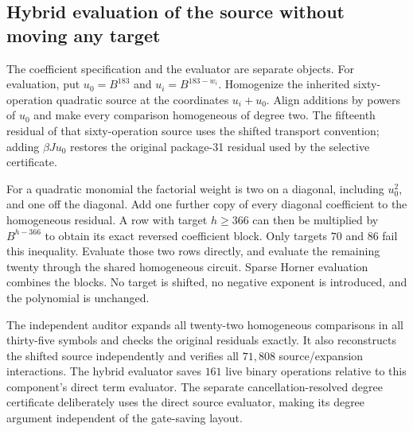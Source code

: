 \subsection{Hybrid evaluation of the source without moving any target}
The coefficient specification and the evaluator are separate objects.
For evaluation, put $u_0=B^{183}$ and $u_i=B^{183-w_i}$.
Homogenize the inherited sixty-operation quadratic source at the coordinates
$u_i+u_0$. Align additions by powers of $u_0$ and make every comparison
homogeneous of degree two. The fifteenth residual of that sixty-operation
source uses the shifted transport convention; adding $\beta J u_0$ restores
the original package-31 residual used by the selective certificate.

For a quadratic monomial the factorial weight is two on a diagonal, including
$u_0^2$, and one off the diagonal. Add one further copy of every diagonal
coefficient to the homogeneous residual. A row with target $h\ge366$ can then
be multiplied by $B^{h-366}$ to obtain its exact reversed coefficient block.
Only targets $70$ and $86$ fail this inequality. Evaluate those two rows
directly, and evaluate the remaining twenty through the shared homogeneous
circuit. Sparse Horner evaluation combines the blocks. No target is shifted,
no negative exponent is introduced, and the polynomial is unchanged.

The independent auditor expands all twenty-two homogeneous comparisons in
all thirty-five symbols and checks the original residuals exactly. It also
reconstructs the shifted source independently and verifies all $71{,}808$
source/expansion interactions. The hybrid evaluator saves $161$ live binary
operations relative to this component's direct term evaluator. The separate
cancellation-resolved degree certificate deliberately uses the direct source
evaluator, making its degree argument independent of the gate-saving layout.
